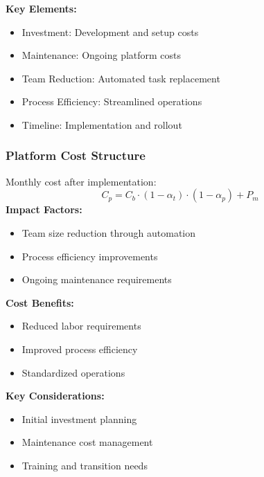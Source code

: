 \documentclass[12pt,a4paper]{article}
\newenvironment{definition}[1]
{\begin{mdframed}[style=definitionstyle,frametitle={Definition: #1}]}
{\end{mdframed}}
\newenvironment{explanation}
{\begin{mdframed}[style=explanationstyle,frametitle={Explanation}]}
{\end{mdframed}}
\newenvironment{observation}
{\begin{mdframed}[style=observationstyle,frametitle={Observation}]}
{\end{mdframed}}
\begin{document}
\begin{explanation}
\textbf{Key Elements:}
\begin{itemize}
    \item Investment: Development and setup costs
    \item Maintenance: Ongoing platform costs
    \item Team Reduction: Automated task replacement
    \item Process Efficiency: Streamlined operations
    \item Timeline: Implementation and rollout
\end{itemize}
\end{explanation}

\subsubsection{Platform Cost Structure}
\begin{definition}{Platform Cost}
Monthly cost after implementation:
\begin{equation}
    C_p = C_b \cdot (1 - \alpha_t) \cdot (1 - \alpha_p) + P_m
\end{equation}
\textbf{Impact Factors:}
\begin{itemize}
    \item Team size reduction through automation
    \item Process efficiency improvements
    \item Ongoing maintenance requirements
\end{itemize}
\end{definition}

\begin{observation}
\textbf{Cost Benefits:}
\begin{itemize}
    \item Reduced labor requirements
    \item Improved process efficiency
    \item Standardized operations
\end{itemize}
\textbf{Key Considerations:}
\begin{itemize}
    \item Initial investment planning
    \item Maintenance cost management
    \item Training and transition needs
\end{itemize}
\end{observation}
\end{document}
